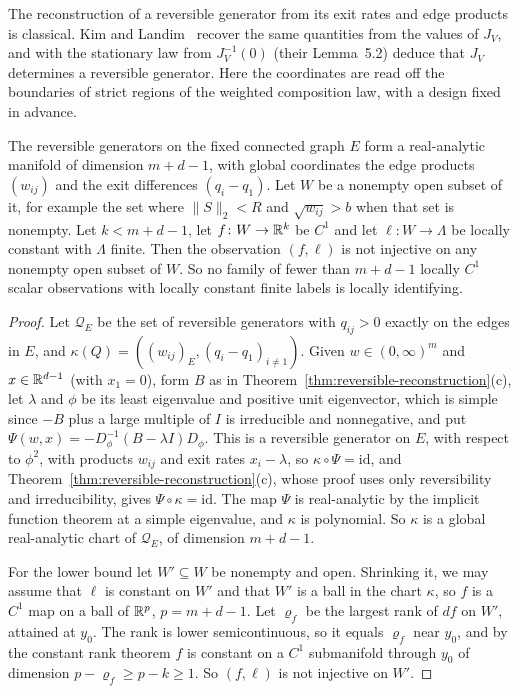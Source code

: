 The reconstruction of a reversible generator from its exit rates and edge products is
classical. Kim and Landim~\cite[Lemma~5.1 and Corollary~5.3]{kl2024} recover the same
quantities from the values of $J_V$, and with the stationary law from $J_V^{-1}(0)$ (their
Lemma~5.2) deduce that $J_V$ determines a reversible generator. Here the coordinates are read
off the boundaries of strict regions of the weighted composition law, with a design fixed in
advance.

\begin{proposition}\label{thm:minimality}
The reversible generators on the fixed connected graph $E$ form a real-analytic manifold of
dimension $m+d-1$, with global coordinates the edge products $(w_{ij})$ and the exit differences
$(q_i-q_1)$. Let $W$ be a nonempty open subset of it, for example the set where $\|S\|_2<R$ and
$\sqrt{w_{ij}}>b$ when that set is nonempty. Let $k<m+d-1$, let $f\colon W\to\mathbb{R}^k$ be $C^1$ and
let $\ell\colon W\to\Lambda$ be locally constant with $\Lambda$ finite. Then the observation
$(f,\ell)$ is not injective on any nonempty open subset of $W$. So no family of fewer than
$m+d-1$ locally $C^1$ scalar observations with locally constant finite labels is locally
identifying.
\end{proposition}

\begin{proof}
Let $\mathcal Q_E$ be the set of reversible generators with $q_{ij}>0$ exactly on the edges in
$E$, and $\kappa(Q)=((w_{ij})_E,(q_i-q_1)_{i\ne1})$. Given $w\in(0,\infty)^m$ and
$x\in\mathbb{R}^{d-1}$ (with $x_1=0$), form $B$ as in Theorem~\ref{thm:reversible-reconstruction}(c),
let $\lambda$ and $\phi$ be its least eigenvalue and positive unit eigenvector, which is simple
since $-B$ plus a large multiple of $I$ is irreducible and nonnegative, and put
$\Psi(w,x)=-D_\phi^{-1}(B-\lambda I)D_\phi$. This is a reversible generator on $E$, with respect
to $\phi^2$, with products $w_{ij}$ and exit rates $x_i-\lambda$, so $\kappa\circ\Psi=\mathrm{id}$,
and Theorem~\ref{thm:reversible-reconstruction}(c), whose proof uses only reversibility and
irreducibility, gives $\Psi\circ\kappa=\mathrm{id}$. The map $\Psi$ is real-analytic by the
implicit function theorem at a simple eigenvalue, and $\kappa$ is polynomial. So $\kappa$ is a
global real-analytic chart of $\mathcal Q_E$, of dimension $m+d-1$.

For the lower bound let $W'\subseteq W$ be nonempty and open. Shrinking it, we may assume that
$\ell$ is constant on $W'$ and that $W'$ is a ball in the chart $\kappa$, so $f$ is a $C^1$ map on
a ball of $\mathbb{R}^p$, $p=m+d-1$. Let $\varrho_f$ be the largest rank of $df$ on $W'$, attained at
$y_0$. The rank is lower semicontinuous, so it equals $\varrho_f$ near $y_0$, and by the constant
rank theorem $f$ is constant on a $C^1$ submanifold through $y_0$ of dimension
$p-\varrho_f\ge p-k\ge1$. So $(f,\ell)$ is not injective on $W'$.
\end{proof}

